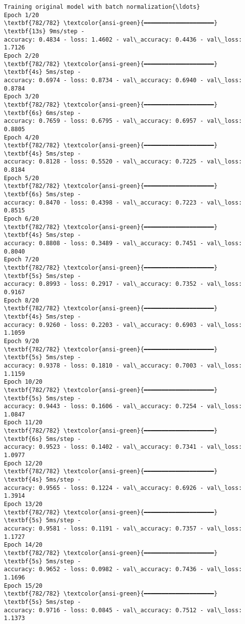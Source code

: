 \documentclass[11pt]{article}
\begin{document}
\begin{Verbatim}[commandchars=\\\{\}]
Training original model with batch normalization{\ldots}
Epoch 1/20
\textbf{782/782} \textcolor{ansi-green}{━━━━━━━━━━━━━━━━━━━━} \textbf{13s} 9ms/step -
accuracy: 0.4834 - loss: 1.4602 - val\_accuracy: 0.4436 - val\_loss: 1.7126
Epoch 2/20
\textbf{782/782} \textcolor{ansi-green}{━━━━━━━━━━━━━━━━━━━━} \textbf{4s} 5ms/step -
accuracy: 0.6974 - loss: 0.8734 - val\_accuracy: 0.6940 - val\_loss: 0.8784
Epoch 3/20
\textbf{782/782} \textcolor{ansi-green}{━━━━━━━━━━━━━━━━━━━━} \textbf{6s} 6ms/step -
accuracy: 0.7659 - loss: 0.6795 - val\_accuracy: 0.6957 - val\_loss: 0.8805
Epoch 4/20
\textbf{782/782} \textcolor{ansi-green}{━━━━━━━━━━━━━━━━━━━━} \textbf{4s} 5ms/step -
accuracy: 0.8128 - loss: 0.5520 - val\_accuracy: 0.7225 - val\_loss: 0.8184
Epoch 5/20
\textbf{782/782} \textcolor{ansi-green}{━━━━━━━━━━━━━━━━━━━━} \textbf{6s} 5ms/step -
accuracy: 0.8470 - loss: 0.4398 - val\_accuracy: 0.7223 - val\_loss: 0.8515
Epoch 6/20
\textbf{782/782} \textcolor{ansi-green}{━━━━━━━━━━━━━━━━━━━━} \textbf{4s} 5ms/step -
accuracy: 0.8808 - loss: 0.3489 - val\_accuracy: 0.7451 - val\_loss: 0.8040
Epoch 7/20
\textbf{782/782} \textcolor{ansi-green}{━━━━━━━━━━━━━━━━━━━━} \textbf{5s} 5ms/step -
accuracy: 0.8993 - loss: 0.2917 - val\_accuracy: 0.7352 - val\_loss: 0.9167
Epoch 8/20
\textbf{782/782} \textcolor{ansi-green}{━━━━━━━━━━━━━━━━━━━━} \textbf{4s} 5ms/step -
accuracy: 0.9260 - loss: 0.2203 - val\_accuracy: 0.6903 - val\_loss: 1.1059
Epoch 9/20
\textbf{782/782} \textcolor{ansi-green}{━━━━━━━━━━━━━━━━━━━━} \textbf{5s} 5ms/step -
accuracy: 0.9378 - loss: 0.1810 - val\_accuracy: 0.7003 - val\_loss: 1.1159
Epoch 10/20
\textbf{782/782} \textcolor{ansi-green}{━━━━━━━━━━━━━━━━━━━━} \textbf{5s} 5ms/step -
accuracy: 0.9443 - loss: 0.1606 - val\_accuracy: 0.7254 - val\_loss: 1.0847
Epoch 11/20
\textbf{782/782} \textcolor{ansi-green}{━━━━━━━━━━━━━━━━━━━━} \textbf{6s} 5ms/step -
accuracy: 0.9523 - loss: 0.1402 - val\_accuracy: 0.7341 - val\_loss: 1.0977
Epoch 12/20
\textbf{782/782} \textcolor{ansi-green}{━━━━━━━━━━━━━━━━━━━━} \textbf{4s} 5ms/step -
accuracy: 0.9565 - loss: 0.1224 - val\_accuracy: 0.6926 - val\_loss: 1.3914
Epoch 13/20
\textbf{782/782} \textcolor{ansi-green}{━━━━━━━━━━━━━━━━━━━━} \textbf{5s} 5ms/step -
accuracy: 0.9581 - loss: 0.1191 - val\_accuracy: 0.7357 - val\_loss: 1.1727
Epoch 14/20
\textbf{782/782} \textcolor{ansi-green}{━━━━━━━━━━━━━━━━━━━━} \textbf{5s} 5ms/step -
accuracy: 0.9652 - loss: 0.0982 - val\_accuracy: 0.7436 - val\_loss: 1.1696
Epoch 15/20
\textbf{782/782} \textcolor{ansi-green}{━━━━━━━━━━━━━━━━━━━━} \textbf{5s} 5ms/step -
accuracy: 0.9716 - loss: 0.0845 - val\_accuracy: 0.7512 - val\_loss: 1.1373

\end{Verbatim}
\end{document}
